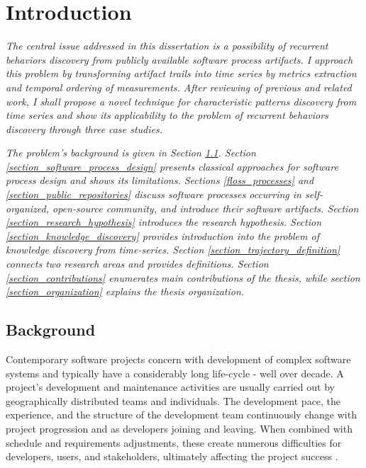 \chapter{Introduction}\label{chapter_introduction}
\textit{The central issue addressed in this dissertation is a possibility of recurrent behaviors discovery from 
publicly available software process artifacts. I approach this problem by transforming artifact trails into 
time series by metrics extraction and temporal ordering of measurements. After reviewing of previous and related 
work, I shall propose a novel technique for characteristic patterns discovery from time series and show its 
applicability to the problem of recurrent behaviors discovery through three case studies.}

\textit{The problem's background is given in Section \ref{section_background}. 
Section \ref{section_software_process_design} presents classical approaches for software process design and 
shows its limitations. 
Sections \ref{floss_processes} and \ref{section_public_repositories} discuss software processes occurring in 
self-organized, open-source community, and introduce their software artifacts.
Section \ref{section_research_hypothesis} introduces the research hypothesis.
Section \ref{section_knowledge_discovery} provides introduction into the problem of knowledge discovery from time-series.
Section \ref{section_trajectory_definition} connects two research areas and provides definitions.
Section \ref{section_contributions} enumerates main contributions of the thesis, 
while section \ref{section_organization} explains the thesis organization.}

%
%
\section{Background}\label{section_background}
Contemporary software projects concern with development of complex software systems and typically have 
a considerably long life-cycle - well over decade.
A project's development and maintenance activities are usually carried out by geographically 
distributed teams and individuals. The development pace, the experience, and the structure of the 
development team continuously change with project progression and as developers joining and leaving. 
When combined with schedule and requirements adjustments, these create numerous difficulties 
for developers, users, and stakeholders, ultimately affecting the project success \cite{citeulike:2207657}. 

